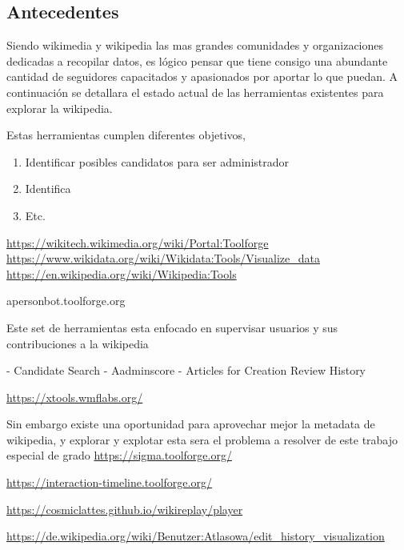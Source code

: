 \subsection{Antecedentes}

Siendo wikimedia y wikipedia las mas grandes comunidades y organizaciones dedicadas a recopilar datos, es lógico pensar que tiene consigo una abundante cantidad de seguidores capacitados y apasionados por aportar lo que puedan. A continuación se detallara el estado actual de las herramientas existentes para explorar la wikipedia.

Estas herramientas cumplen diferentes objetivos, 

\begin{enumerate}
    \item Identificar posibles candidatos para ser administrador
    \item Identifica 
    \item Etc.
  \end{enumerate}


\url{https://wikitech.wikimedia.org/wiki/Portal:Toolforge}
\url{https://www.wikidata.org/wiki/Wikidata:Tools/Visualize_data}
\url{https://en.wikipedia.org/wiki/Wikipedia:Tools}

apersonbot.toolforge.org

Este set de herramientas esta enfocado en supervisar usuarios y sus contribuciones a la wikipedia

- Candidate Search
- Aadminscore
- Articles for Creation Review History

\url{https://xtools.wmflabs.org/}


Sin embargo existe una oportunidad para aprovechar mejor la metadata de wikipedia, y explorar y explotar esta sera el problema a resolver de este trabajo especial de grado
\url{https://sigma.toolforge.org/}


\url{https://interaction-timeline.toolforge.org/}


\url{https://cosmiclattes.github.io/wikireplay/player}


\url{https://de.wikipedia.org/wiki/Benutzer:Atlasowa/edit_history_visualization}